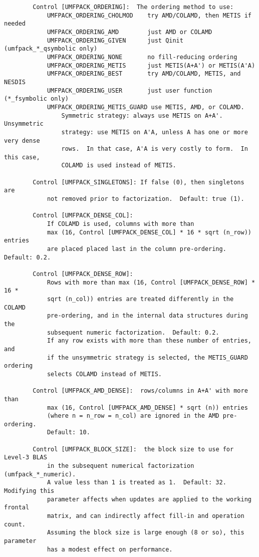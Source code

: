 \documentclass[11pt]{article}
\begin{document}
{\begin{verbatim}
        Control [UMFPACK_ORDERING]:  The ordering method to use:
            UMFPACK_ORDERING_CHOLMOD    try AMD/COLAMD, then METIS if needed
            UMFPACK_ORDERING_AMD        just AMD or COLAMD
            UMFPACK_ORDERING_GIVEN      just Qinit (umfpack_*_qsymbolic only)
            UMFPACK_ORDERING_NONE       no fill-reducing ordering
            UMFPACK_ORDERING_METIS      just METIS(A+A') or METIS(A'A)
            UMFPACK_ORDERING_BEST       try AMD/COLAMD, METIS, and NESDIS
            UMFPACK_ORDERING_USER       just user function (*_fsymbolic only)
            UMFPACK_ORDERING_METIS_GUARD use METIS, AMD, or COLAMD.
                Symmetric strategy: always use METIS on A+A'.  Unsymmetric
                strategy: use METIS on A'A, unless A has one or more very dense
                rows.  In that case, A'A is very costly to form.  In this case,
                COLAMD is used instead of METIS.

        Control [UMFPACK_SINGLETONS]: If false (0), then singletons are
            not removed prior to factorization.  Default: true (1).

        Control [UMFPACK_DENSE_COL]:
            If COLAMD is used, columns with more than
            max (16, Control [UMFPACK_DENSE_COL] * 16 * sqrt (n_row)) entries
            are placed placed last in the column pre-ordering.  Default: 0.2.

        Control [UMFPACK_DENSE_ROW]:
            Rows with more than max (16, Control [UMFPACK_DENSE_ROW] * 16 *
            sqrt (n_col)) entries are treated differently in the COLAMD
            pre-ordering, and in the internal data structures during the
            subsequent numeric factorization.  Default: 0.2.
            If any row exists with more than these number of entries, and
            if the unsymmetric strategy is selected, the METIS_GUARD ordering
            selects COLAMD instead of METIS.

        Control [UMFPACK_AMD_DENSE]:  rows/columns in A+A' with more than
            max (16, Control [UMFPACK_AMD_DENSE] * sqrt (n)) entries
            (where n = n_row = n_col) are ignored in the AMD pre-ordering.
            Default: 10.

        Control [UMFPACK_BLOCK_SIZE]:  the block size to use for Level-3 BLAS
            in the subsequent numerical factorization (umfpack_*_numeric).
            A value less than 1 is treated as 1.  Default: 32.  Modifying this
            parameter affects when updates are applied to the working frontal
            matrix, and can indirectly affect fill-in and operation count.
            Assuming the block size is large enough (8 or so), this parameter
            has a modest effect on performance.


\end{verbatim}}
\end{document}
